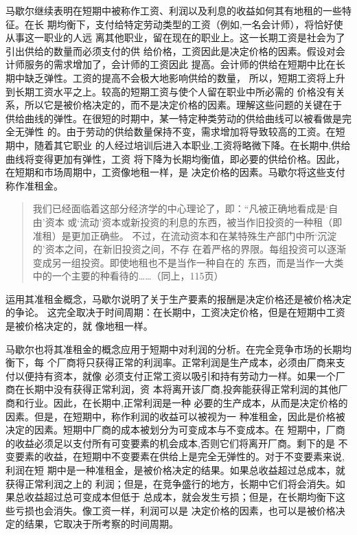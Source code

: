 马歇尔继续表明在短期中被称作工资、利润以及利息的收益如何其有地租的一些特征。在长
期均衡下，支付给特定劳动类型的工资（例如,一名会计师），将恰好使从事这一职业的人远
离其他职业，留在现在的职业上。这一长期工资是社会为了引出供给的数量而必须支付的供
给价格，工资因此是决定价格的因素。假设对会计师服务的需求增加了，会计师的工资因此
提高。会计师的供给在短期中比在长期中缺乏弹性。工资的提高不会极大地影响供给的数量，
所以，短期工资将上升到长期工资水平之上。较高的短期工资与使个人留在职业中所必需的
价格没有关系，所以它是被价格决定的，而不是决定价格的因素。理解这些问题的关键在于
供给曲线的弹性。在很短的时期中，某一特定种类劳动的供给曲线可以被看做是完全无弹性
的。由于劳动的供给数量保持不变，需求增加将导致较高的工资。在短期中，随着其它职业
的人经过培训后进入本职业,工资将略微下降。在长期中,供给曲线将变得更加有弹性，工资
将下降为长期均衡值，即必要的供给价格。因此，在短期和市场周期中，工资像地租一样，是
决定价格的因素。马歇尔将这些支付称作准租金。

\begin{quotation}
  我们已经面临着这部分经济学的中心理论了，即：“凡被正确地看成是‘自由’资本
  或‘流动’资本或新投资的利息的东西，被当作旧投资的一种租（即准租）是更加正确些。
  不过，在流动资本和在某特殊生产部门中所‘沉淀的’资本之间，在新旧投资之间，不存
  在着严格的界限。每组投资可以逐渐变成另一组投资。即使地租也不是当作一种自在的
  东西，而是当作一大类中的一个主要的种看待的……（同上，115页）
\end{quotation}

运用其准租金概念，马歇尔说明了关于生产要素的报酬是决定价格还是被价格决定的争论。
这完全取决于时间周期：在长期中，工资决定价格，但是在短期中工资是被价格决定的，就
像地租一样。

马歇尔也将其准租金的概念应用于短期中对利润的分析。在完全竞争市场的长期均衡下，每
个厂商将只获得正常的利润率。正常利润是生产成本，必须由厂商来支付以便持有资本，就像
必须支付正常工资以吸引和持有劳动力一样。如果一个厂商在长期中没有获得正常利润，资
本将离开该厂商,投奔能获得正常利润的其他厂商和行业。因此，在长期中,正常利润是一种
必要的生产成本，从而是决定价格的因素。但是，在短期中，称作利润的收益可以被视为一
种准租金，因此是价格被决定的因素。短期中厂商的成本被划分为可变成本与不变成本。在
短期中，厂商的收益必须足以支付所有可变要素的机会成本,否则它们将离开厂商。剩下的是
不变要素的收益，在短期中不变要素在供给上是完全无弹性的。对于不变要素来说,利润在短
期中是一种准租金，是被价格决定的结果。如果总收益超过总成本，就获得正常利润之上的
利润；但是，在竞争盛行的地方，长期中它们将会消失。如果总收益超过总可变成本但低于
总成本，就会发生亏损；但是，在长期均衡下这些亏损也会消失。像工资一样，利润可以是
决定价格的因素，也可以是被价格决定的结果，它取决于所考察的时间周期。

